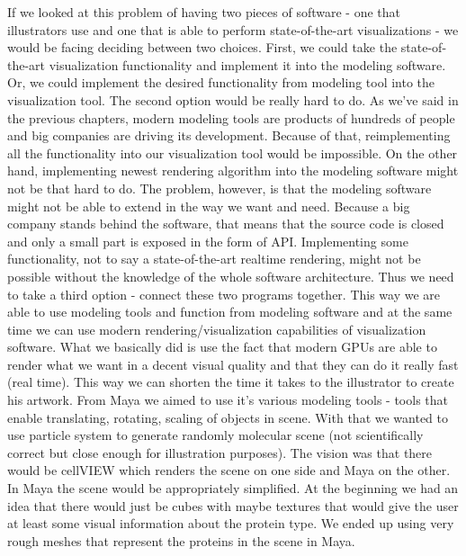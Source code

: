 \documentclass[
  digital, %
  table,   %
  lof,     %
  lot,     %
]{fithesis3}
\begin{document}
If we looked at this problem of having two pieces of software - one that illustrators use and one that is able to perform state-of-the-art visualizations - we would be facing deciding between two choices. First, we could take the state-of-the-art visualization functionality and implement it into the modeling software. Or, we could implement the desired functionality from modeling tool into the visualization tool. The second option would be really hard to do. As we've said in the previous chapters, modern modeling tools are products of hundreds of people and big companies are driving its development. Because of that, reimplementing all the functionality into our visualization tool would be impossible. On the other hand, implementing newest rendering algorithm into the modeling software might not be that hard to do. The problem, however, is that the modeling software might not be able to extend in the way we want and need. Because a big company stands behind the software, that means that the source code is closed and only a small part is exposed in the form of API. Implementing some functionality, not to say a state-of-the-art realtime rendering, might not be possible without the knowledge of the whole software architecture. Thus we need to take a third option - connect these two programs together. This way we are able to use modeling tools and function from modeling software and at the same time we can use modern rendering/visualization capabilities of visualization software.
What we basically did is use the fact that modern GPUs are able to render what we want in a decent visual quality and that they can do it really fast (real time). This way we can shorten the time it takes to the illustrator to create his artwork.
From Maya we aimed to use it's various modeling tools - tools that enable translating, rotating, scaling of objects in scene. With that we wanted to use particle system to generate randomly molecular scene (not scientifically correct but close enough for illustration purposes).
The vision was that there would be cellVIEW which renders the scene on one side and Maya on the other. In Maya the scene would be appropriately simplified. At the beginning we had an idea that there would just be cubes with maybe textures that would give the user at least some visual information about the protein type. We ended up using very rough meshes that represent the proteins in the scene in Maya.
\end{document}
